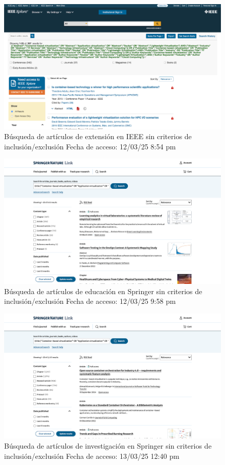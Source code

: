 \FloatBarrier\begin{figure}[H]
    \centering
    \includegraphics[width=\textwidth,keepaspectratio]{apendices/BD/sin-criterios/IEEE-ind.png}
    \caption{Búsqueda de artículos de extensión en IEEE sin criterios de inclusión/exclusión
    Fecha de acceso: 12/03/25 8:54 pm
    }
\end{figure}
\FloatBarrier\begin{figure}[H]
    \centering
    \includegraphics[width=\textwidth,keepaspectratio]{apendices/BD/sin-criterios/Springer-ed.png}
    \caption{Búsqueda de artículos de educación en Springer sin criterios de inclusión/exclusión
    Fecha de acceso: 12/03/25 9:58 pm
    }
\end{figure}
\FloatBarrier\begin{figure}[H]
    \centering
    \includegraphics[width=\textwidth,keepaspectratio]{apendices/BD/sin-criterios/Springer-inv.png}
    \caption{Búsqueda de artículos de investigación en Springer sin criterios de inclusión/exclusión
    Fecha de acceso: 13/03/25 12:40 pm
    }
\end{figure}
